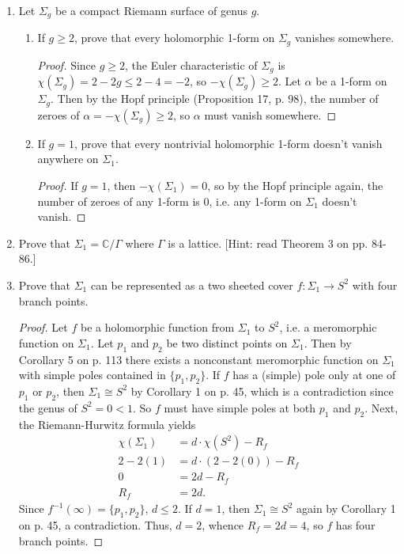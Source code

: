 \documentclass[11pt,oneside,english,reqno]{amsart}
\theoremstyle{definition}
\newcommand{\MB}[1]{\mathbb{#1}}
\begin{document}
\begin{enumerate}[leftmargin=*]
\item Let $\Sigma_g$ be a compact Riemann surface of genus $g$.
\begin{enumerate}
\itemsep5mm
\item If $g\geq 2$, prove that every holomorphic 1-form on $\Sigma_g$ vanishes somewhere.

\begin{proof}
Since $g\geq 2$, the Euler characteristic of $\Sigma_g$ is $\chi(\Sigma_g)=2-2g\leq2-4=-2$, so $-\chi(\Sigma_g)\geq 2$. Let $\alpha$ be a 1-form on $\Sigma_g$. Then by the Hopf principle (Proposition 17, p. 98), the number of zeroes of $\alpha=-\chi(\Sigma_g)\geq2$, so $\alpha$ must vanish somewhere. 
\end{proof}

\item If $g=1$, prove that every nontrivial holomorphic 1-form doesn't vanish anywhere on $\Sigma_1$.

\begin{proof}
If $g=1$, then $-\chi(\Sigma_1)=0$, so by the Hopf principle again, the number of zeroes of any 1-form is 0, i.e. any 1-form on $\Sigma_1$ doesn't vanish.
\end{proof}

\end{enumerate}

\item Prove that $\Sigma_1=\MB{C}/\Gamma$ where $\Gamma$ is a lattice. [Hint: read Theorem 3 on pp. 84-86.]

\item Prove that $\Sigma_1$ can be represented as a two sheeted cover $f:\Sigma_1\to S^2$ with four branch points.

\begin{proof}
Let $f$ be a holomorphic function from $\Sigma_1$ to $S^2$, i.e. a meromorphic function on $\Sigma_1$. Let $p_1$ and $p_2$ be two distinct points on $\Sigma_1$. Then by Corollary 5 on p. 113 there exists a nonconstant meromorphic function on $\Sigma_1$ with simple poles contained in $\{p_1,p_2\}$. If $f$ has a (simple) pole only at one of $p_1$ or $p_2$, then $\Sigma_1\cong S^2$ by Corollary 1 on p. 45, which is a contradiction since the genus of $S^2=0<1$. So $f$ must have simple poles at both $p_1$ and $p_2$. Next, the Riemann-Hurwitz formula yields
\begin{align*}
\chi(\Sigma_1)&=d\cdot\chi(S^2)-R_f\\
2-2(1)&=d\cdot(2-2(0))-R_f\\
0&=2d-R_f\\
R_f&=2d.
\end{align*}
Since $f^{-1}(\infty)=\{p_1,p_2\}$, $d\leq2$. If $d=1$, then $\Sigma_1\cong S^2$ again by Corollary 1 on p. 45, a contradiction. Thus, $d=2$, whence $R_f=2d=4$, so $f$ has four branch points.
\end{proof}


\end{enumerate}
\end{document}
